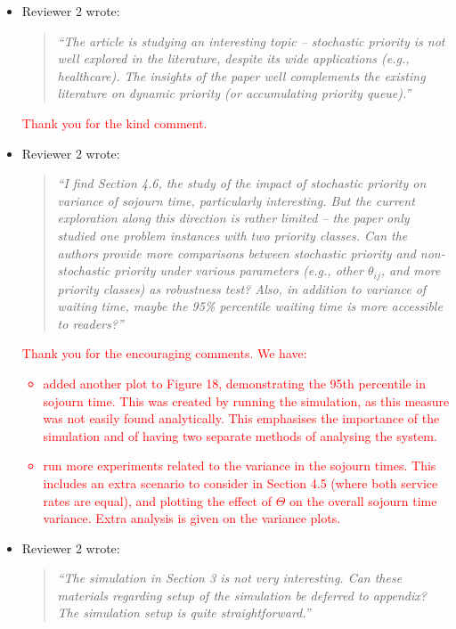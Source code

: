 \documentclass{article}
\begin{document}
\begin{itemize}

\item Reviewer 2 wrote:
\begin{quote}\it
``The article is studying an interesting topic -- stochastic priority is not well explored in the literature, despite its wide applications (e.g., healthcare). The insights of the paper well complements the existing literature on dynamic priority (or accumulating priority queue).''
\end{quote}

\textcolor{red}{Thank you for the kind comment.}

\item Reviewer 2 wrote:
\begin{quote}\it
``I find Section 4.6, the study of the impact of stochastic priority on variance of sojourn time, particularly interesting. But the current exploration along this direction is rather limited -- the paper only studied one problem instances with two priority classes. Can the authors provide more comparisons between stochastic priority and non-stochastic priority under various parameters (e.g., other $\theta_{ij}$, and more priority classes) as robustness test? Also, in addition to variance of waiting time, maybe the 95\% percentile waiting time is more accessible to readers?''
\end{quote}

\textcolor{red}{Thank you for the encouraging comments. We have:
\begin{itemize}
  \item added another plot to Figure 18, demonstrating the 95th percentile in sojourn time. This was created by running the simulation, as this measure was not easily found analytically. This emphasises the importance of the simulation and of having two separate methods of analysing the system.
  \item run more experiments related to the variance in the sojourn times. This includes an extra scenario to consider in Section 4.5 (where both service rates are equal), and plotting the effect of $\Theta$ on the overall sojourn time variance. Extra analysis is given on the variance plots.
\end{itemize}
}

\item Reviewer 2 wrote:
\begin{quote}\it
``The simulation in Section 3 is not very interesting. Can these materials regarding setup of the simulation be deferred to appendix? The simulation setup is quite straightforward.''
\end{quote}


\end{itemize}
\end{document}
